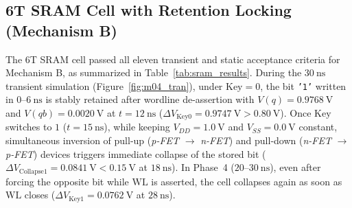 \subsection{6T SRAM Cell with Retention Locking (Mechanism B)}\label{sec:res_sram}

The 6T SRAM cell passed all eleven transient and static acceptance criteria for Mechanism B, as summarized in Table~\ref{tab:sram_results}. During the $30\ \text{ns}$ transient simulation (Figure~\ref{fig:m04_tran}), under $\text{Key} = 0$, the bit \texttt{'1'} written in $0\text{--}6\ \text{ns}$ is stably retained after wordline de-assertion with $V(q) = 0.9768\ \text{V}$ and $V(qb) = 0.0020\ \text{V}$ at $t=12\ \text{ns}$ ($\Delta V_{\mathrm{Key0}} = 0.9747\ \text{V} > 0.80\ \text{V}$). Once $\text{Key}$ switches to $1$ ($t = 15\ \text{ns}$), while keeping $V_{DD} = 1.0\ \text{V}$ and $V_{SS} = 0.0\ \text{V}$ constant, simultaneous inversion of pull-up (\textit{p-FET} $\to$ \textit{n-FET}) and pull-down (\textit{n-FET} $\to$ \textit{p-FET}) devices triggers immediate collapse of the stored bit ($\Delta V_{\mathrm{Collapse1}} = 0.0841\ \text{V} < 0.15\ \text{V}$ at $18\ \text{ns}$). In Phase~4 ($20\text{--}30\ \text{ns}$), even after forcing the opposite bit while $\mathrm{WL}$ is asserted, the cell collapses again as soon as $\mathrm{WL}$ closes ($\Delta V_{\mathrm{Key1}} = 0.0762\ \text{V}$ at $28\ \text{ns}$).

